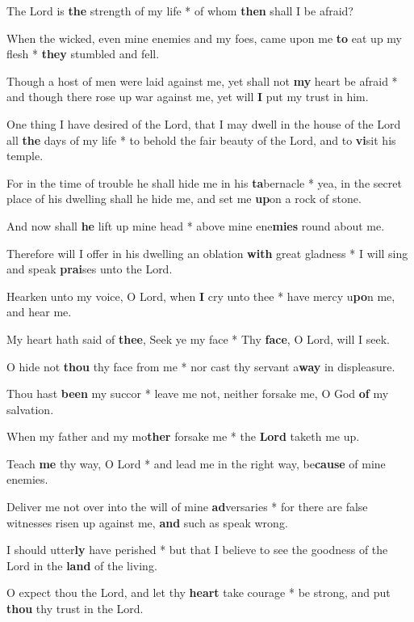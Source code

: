 \begin{multicols}{2}
	The Lord is \textbf{the} strength of my life * of whom \textbf{then} shall I be afraid?
	
	When the wicked, even mine enemies and my foes, came upon me \textbf{to} eat up my flesh * \textbf{they} stumbled and fell.
	
	Though a host of men were laid against me, yet shall not \textbf{my} heart be afraid * and though there rose up war against me, yet will \textbf{I} put my trust in him.
	
	One thing I have desired of the Lord, that I may dwell in the house of the Lord all \textbf{the} days of my life * to behold the fair beauty of the Lord, and to \textbf{vi}sit his temple.
	
	For in the time of trouble he shall hide me in his \textbf{ta}bernacle * yea, in the secret place of his dwelling shall he hide me, and set me \textbf{up}on a rock of stone.
	
	And now shall \textbf{he} lift up mine head * above mine ene\textbf{mies} round about me.
	
	Therefore will I offer in his dwelling an oblation \textbf{with} great gladness * I will sing and speak \textbf{prai}ses unto the Lord.
	
	Hearken unto my voice, O Lord, when \textbf{I} cry unto thee * have mercy u\textbf{po}n me, and hear me.
	
	My heart hath said of \textbf{thee}, Seek ye my face * Thy \textbf{face}, O Lord, will I seek.
	
	O hide not \textbf{thou} thy face from me * nor cast thy servant a\textbf{way} in displeasure.
	
	Thou hast \textbf{been} my succor * leave me not, neither forsake me, O God \textbf{of} my salvation.
	
	When my father and my mo\textbf{ther} forsake me * the \textbf{Lord} taketh me up.
	
	Teach \textbf{me} thy way, O Lord * and lead me in the right way, be\textbf{cause} of mine enemies.
	
	Deliver me not over into the will of mine \textbf{ad}versaries * for there are false witnesses risen up against me, \textbf{and} such as speak wrong.
	
	I should utter\textbf{ly} have perished * but that I believe  to see the goodness of the Lord in the \textbf{land} of the living.
	
	O expect thou the Lord, and let thy \textbf{heart} take courage * be strong, and put \textbf{thou} thy trust in the Lord.
\end{multicols}